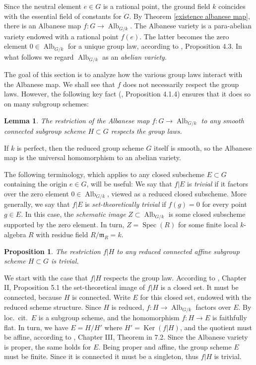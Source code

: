 \documentclass[oneside, 12pt]{amsart}
\newcommand\mylabel[1]{\label{#1}\marginpar{\vspace{-1ex}\medskip\medskip\footnotesize \tt #1}}
\renewcommand\mylabel[1]{\label{#1}}
\newtheorem{lemma}[theorem]{Lemma}
\newtheorem{proposition}[theorem]{Proposition}
\theoremstyle{definition}
\theoremstyle{remark}
\newcommand{\Alb}{\operatorname{Alb}}
\newcommand{\Kernel}{\operatorname{Ker}}
\newcommand{\maxid}{\mathfrak{m}}
\newcommand{\ra}{\rightarrow}
\newcommand{\Spec}{\operatorname{Spec}}
\begin{document}
Since the neutral element $e\in G$ is a rational point, the ground field $k$ coincides with the essential field of constants
for $G$. By Theorem \ref{existence albanese map}, there is an  Albanese map $f:G\ra\Alb_{G/k}$.
The Albanese variety is a para-abelian variety endowed with a rational point $f(e)$.
The latter becomes the zero element $0\in\Alb_{G/k}$ for a unique group law, according to  \cite{Laurent; Schroeer 2021}, Proposition 4.3.
In what follows we regard $\Alb_{G/k}$ as an \emph{abelian variety}. 
 
The goal of this section is to analyze how the  various group laws
interact with the Albanese map.  We shall see  that   $f$ does not necessarily respect the group laws.
However, the    following key fact (\cite{Brion 2017}, Proposition 4.1.4) ensures that it does  so on many 
subgroup schemes:

\begin{lemma}
\mylabel{restriction respects group law}
The restriction of the Albanese map $f:G\ra \Alb_{G/k}$ to any smooth connected subgroup scheme $H\subset G$ respects the group laws.
\end{lemma}

If $k$ is perfect, then the reduced group scheme $G$ itself is smooth, so the Albanese map is the universal homomorphism 
to an abelian variety. 

The following terminology, which applies to any closed subscheme  $E\subset G$  containing the origin $e\in G$, will be useful:
We say that $f|E$ is \emph{trivial} if it factors over the zero element $0\in\Alb_{G/k}$, viewed as a reduced closed subscheme.
More generally, we say that $f|E$ is \emph{set-theoretically trivial} if $f(g)=0$ for every  point $g\in E$.
In this case,  the \emph{schematic image} $Z\subset \Alb_{G/k}$ is some closed subscheme supported by the zero element.
In turn, $Z=\Spec(R)$ for some finite local $k$-algebra $R$ with residue field $R/\maxid_R=k$.

\begin{proposition}
\mylabel{restriction is trivial}
The restriction $f|H$  to any reduced connected affine subgroup scheme $H\subset G$   is   trivial.
\end{proposition}

\proof
We start with the case that $f|H$ respects the group law.
According to \cite{Demazure; Gabriel 1970}, Chapter II, Proposition 5.1 the set-theoretical image of $f|H$  is a closed 
set. It must be connected, because $H$ is connected. Write $E$ for this closed set, endowed with the reduced scheme structure. 
Since $H$ is reduced,   $f:H\ra\Alb_{G/k}$ factors over $E$.
By loc.\ cit.\ $E$ is a subgroup scheme, and the homomorphism $f:H\ra E$ is faithfully flat.
In turn, we have $E=H/H'$ where $H'=\Kernel(f|H)$, and the quotient must be affine, according to \cite{Demazure; Gabriel 1970}, Chapter III, Theorem
in 7.2. Since the Albanese variety is proper, the same holds for $E$.
Being proper and affine, the group scheme $E$ must be finite.
Since it is connected it must be a singleton, thus  $f|H$ is trivial. 
\end{document}
